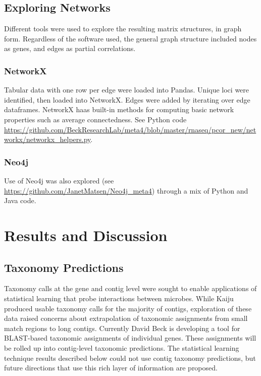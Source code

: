 \subsection{Exploring Networks}
Different tools were used to explore the resulting matrix structures, in graph form.
Regardless of the software used, the general graph structure included nodes as genes, and edges as partial correlations.

\subsubsection{NetworkX}
Tabular data with one row per edge were loaded into Pandas.
Unique loci were identified, then loaded into NetworkX.
Edges were added by iterating over edge dataframes.
NetworkX haas built-in methods for computing basic network properties such as average connectedness.
See Python code \url{https://github.com/BeckResearchLab/meta4/blob/master/rnaseq/pcor_new/networkx/networkx_helpers.py}.

\subsubsection{Neo4j}
Use of Neo4j was also explored (see \url{https://github.com/JanetMatsen/Neo4j_meta4}) through a mix of Python and Java code.


\section{Results and Discussion}

\subsection{Taxonomy Predictions}
\label{results:taxonomy}
Taxonomy calls at the gene and contig level were sought to enable applications of statistical learning that probe interactions between microbes.
While Kaiju produced usable taxonomy calls for the majority of contigs, exploration of these data raised concerns about extrapolation of taxonomic assignments from small match regions to long contigs. %
Currently David Beck is developing a tool for BLAST-based taxonomic assignments of individual genes.
These assignments will be rolled up into contig-level taxonomic predictions.
The statistical learning technique results described below could not use contig taxonomy predictions, but future directions that use this rich layer of information are proposed.

